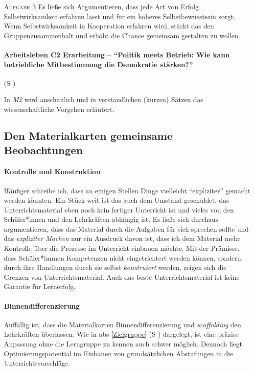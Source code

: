 \textsc{Aufgabe 3} \quad Es ließe sich Argumentieren, dass jede Art von Erfolg Selbstwirksamkeit erfahren lässt und für ein höheres Selbstbewusstsein sorgt. Wenn Selbstwirksamkeit in Kooperation erfahren wird, stärkt das den Gruppenzusammenhalt und erhöht die Chance gemeinsam gestalten zu wollen. 

\paragraph{Arbeitsleben C2 Erarbeitung -- \enquote{Politik meets Betrieb: Wie kann betriebliche Mitbestimmung die Demokratie stärken?}} (\gls{S} \pageref{ARBEITSLEBEN-C2})

In \emph{M2} wird anschaulich und in verständlichen (kurzen) Sätzen das wissenschaftliche Vorgehen erläutert. 






\subsection{Den Materialkarten gemeinsame Beobachtungen}
\paragraph{Kontrolle und Konstruktion}
Häufiger schreibe ich, dass an einigen Stellen Dinge vielleicht \enquote{expliziter} gemacht werden könnten. Ein Stück weit ist das auch dem Umstand geschuldet, das Unterrichtsmaterial eben noch kein fertiger Unterricht ist und vieles von den Schüler*innen und den Lehrkräften abhängig ist. Es ließe sich durchaus argumentieren, dass das Material durch die Aufgaben für sich sprechen sollte und das \emph{expliziter Machen} nur ein Ausdruck davon ist, dass ich dem Material mehr Kontrolle über die Prozesse im Unterricht einbauen möchte. Mit der Prämisse, dass Schüler*innnen Kompetenzen nicht eingetrichtert werden können, sondern durch ihre Handlungen durch sie selbst \emph{konstruiert} werden, zeigen sich die Grenzen von Unterrichtsmaterial. Auch das beste Unterrichtsmaterial ist keine Garantie für Lernerfolg. %

\paragraph{Binnendifferenzierung}
Auffällig ist, dass die Materialkarten Binnendifferenzierung und \emph{scaffolding} den Lehrkräften überlassen. Wie in \gls{abs} \ref{Zielgruppe} (\gls{S} \pageref{Zielgruppe}) dargelegt, ist eine präzise Anpassung ohne die Lerngruppe zu kennen auch schwer möglich. Dennoch liegt Optimierungspotential im Einbauen von grundsätzlichen Abstufungen in die Unterrichtsvorschläge. 

